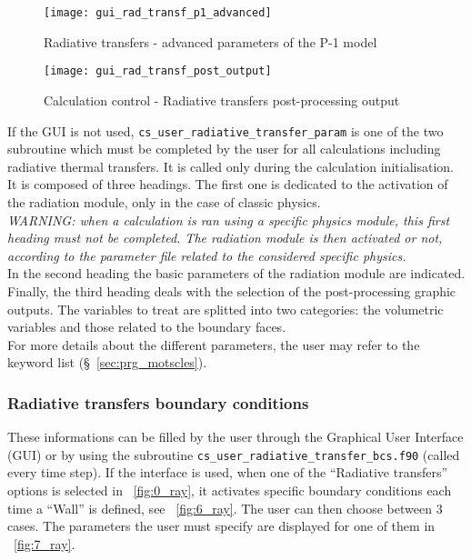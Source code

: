 {{{\begin{figure}[ht]
\begin{center}
\texttt{[image: gui\_rad\_transf\_p1\_advanced]}
\caption{Radiative transfers - advanced parameters of the P-1 model}
\label{fig:4_ray}
\end{center}
\end{figure}

\begin{figure}[ht]
\begin{center}
\texttt{[image: gui\_rad\_transf\_post\_output]}
\caption{Calculation control - Radiative transfers post-processing output}
\label{fig:5_ray}
\end{center}
\end{figure}

If the GUI is not used, \texttt{cs\_user\_radiative\_transfer\_param} is one of the two subroutine which must be completed by the user for all
calculations including radiative thermal transfers. It is called only during the calculation initialisation. It is composed of three headings. The first one is dedicated to the activation
of the radiation module, only in the case of classic physics. \\
{\em WARNING: when a calculation is ran using a specific physics module,
this first heading must not be completed. The radiation module is then
activated or not, according to the parameter file related to the considered
specific physics.} \\

\noindent
In the second heading the basic parameters of the radiation module are indicated.\\
Finally, the third heading deals with the selection of the
post-processing graphic outputs. The variables to treat are splitted
into two categories: the volumetric variables and those related to the
boundary faces.\\

\noindent
For more details about the different parameters, the user may refer to the
keyword list (\S~\ref{sec:prg_motscles}).


\subsubsection{Radiative transfers boundary conditions}
These informations can be filled by the user through the Graphical User Interface
(GUI) or by using the subroutine \texttt{cs\_user\_radiative\_transfer\_bcs.f90} (called every time step). If the
interface is used, when one of the ``Radiative transfers'' options is selected in
\figurename~\ref{fig:0_ray}, it activates specific boundary conditions each time
a ``Wall'' is defined, see \figurename~\ref{fig:6_ray}. The user can then choose
between 3 cases. The parameters the user must specify are displayed for one of
them in \figurename~\ref{fig:7_ray}.

}}}
